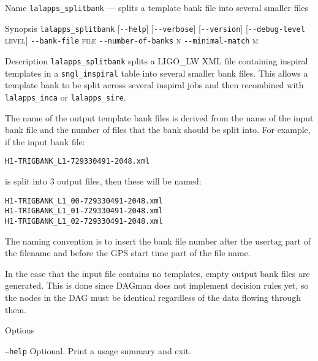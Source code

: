 \begin{entry}
\item[Name]
\verb$lalapps_splitbank$ --- splits a template bank file into several smaller
files

\item[Synopsis]
\verb$lalapps_splitbank$ 
[\verb$--help$]
[\verb$--verbose$]
[\verb$--version$]
[\verb$--debug-level$ \textsc{level}]  \newline
\verb$--bank-file$ \textsc{file}
\verb$--number-of-banks$ \textsc{n}
\verb$--minimal-match$ \textsc{m}

\item[Description] 
\verb$lalapps_splitbank$ splits a LIGO\_LW XML file containing inspiral
templates in a \texttt{sngl\_inspiral} table into several smaller bank
files. This allows a template bank to be split across several inspiral 
jobs and then recombined with \texttt{lalapps\_inca} or
\texttt{lalapps\_sire}.

The name of the output template bank files is derived from the name of 
the input bank file and the number of files that the bank should be split
into. For example, if the input bank file:\\
\begin{center}
\texttt{H1-TRIGBANK\_L1-729330491-2048.xml}\\
\end{center}
is split into 3 output files, then these will be named:\\
\begin{center}
\texttt{H1-TRIGBANK\_L1\_00-729330491-2048.xml}\\
\texttt{H1-TRIGBANK\_L1\_01-729330491-2048.xml}\\
\texttt{H1-TRIGBANK\_L1\_02-729330491-2048.xml}\\
\end{center}
The naming convention is to insert the bank file number after the usertag part
of the filename and before the GPS start time part of the file name.

In the case that the input file contains no templates, empty output bank files
are generated. This is done since DAGman does not implement decision rules
yet, so the nodes in the DAG must be identical regardless of the data flowing
through them.

\item[Options]\leavevmode
\begin{entry}
\item[\texttt{--help}] Optional. Print a usage summary and exit.


\end{entry}
\end{entry}
